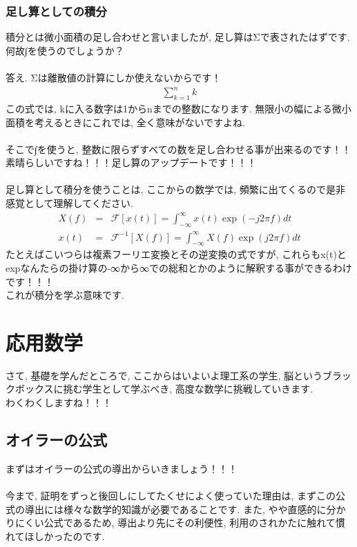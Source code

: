 \documentclass[11pt,a4paper]{jsarticle}
\begin{document}
\subsubsection{足し算としての積分}
積分とは微小面積の足し合わせと言いましたが, 足し算はΣで表されたはずです. 何故∫を使うのでしょうか？\\
\\
答え. Σは離散値の計算にしか使えないからです！\\
\begin{eqnarray}
\sum_{k=1}^{n} k
\end{eqnarray}
この式では, kに入る数字は1からnまでの整数になります. 無限小の幅による微小面積を考えるときにこれでは, 全く意味がないですよね.\\
\\
そこで∫を使うと, 整数に限らずすべての数を足し合わせる事が出来るのです！！\\
素晴らしいですね！！！足し算のアップデートです！！！\\
\\
足し算として積分を使うことは, ここからの数学では, 頻繁に出てくるので是非感覚として理解してください.
\begin{eqnarray}
X(f) &=& \mathcal{F}[x(t)] = \int^{\infty}_{-\infty}x(t)\exp(-j2\pi f)dt \\
 x(t) &=& \mathcal{F}^{-1}[X(f)] = \int^{\infty}_{-\infty}X(f)\exp(j2\pi f)dt 
\end{eqnarray}
たとえばこいつらは複素フーリエ変換とその逆変換の式ですが, これらもx(t)とexpなんたらの掛け算の-∞から∞での総和とかのように解釈する事ができるわけです！！！\\
これが積分を学ぶ意味です.

\section{応用数学}
さて, 基礎を学んだところで, ここからはいよいよ理工系の学生, 脳というブラックボックスに挑む学生として学ぶべき, 高度な数学に挑戦していきます.\\ 
わくわくしますね！！！\\
\subsection{オイラーの公式}
まずはオイラーの公式の導出からいきましょう！！！\\
\\
今まで, 証明をずっと後回しにしてたくせによく使っていた理由は, まずこの公式の導出には様々な数学的知識が必要であることです. また, やや直感的に分かりにくい公式であるため, 導出より先にその利便性, 利用のされかたに触れて慣れてほしかったのです.\\
\end{document}

